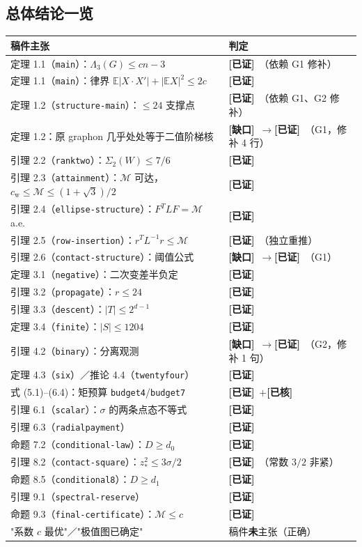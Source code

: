 \documentclass[UTF8,11pt]{ctexart}
\theoremstyle{definition}
\newcommand{\Lam}{\Lambda}
\newcommand{\E}{\mathbb{E}}
\newcommand{\ok}{\textcolor[rgb]{0.05,0.45,0.15}{\bfseries [已证]}}
\newcommand{\chk}{\textcolor[rgb]{0.05,0.25,0.55}{\bfseries [已核]}}
\newcommand{\gap}{\textcolor[rgb]{0.70,0.15,0.10}{\bfseries [缺口]}}
\begin{document}
\subsection{总体结论一览}
\begin{center}
\small
\begin{tabular}{@{}p{}p{}@{}}
\toprule
稿件主张 & 判定\\
\midrule
定理 1.1（\texttt{main}）：$\Lam_3(G)\le cn-3$ & \ok\ （依赖 G1 修补）\\
定理 1.1（\texttt{main}）：律界 $\E|X\!\cdot\!X'|+|\E X|^2\le 2c$ & \ok\\
定理 1.2（\texttt{structure-main}）：$\le24$ 支撑点 & \ok\ （依赖 G1、G2 修补）\\
定理 1.2：原 graphon 几乎处处等于二值阶梯核 & \gap\ $\to$\ok\ （G1，修补 4 行）\\
引理 2.2（\texttt{ranktwo}）：$\Sigma_2(W)\le7/6$ & \ok\\
引理 2.3（\texttt{attainment}）：$\mathcal M$ 可达，$c_{\mathrm w}\le\mathcal M\le(1+\sqrt3)/2$ & \ok\\
引理 2.4（\texttt{ellipse-structure}）：$F^TLF=\mathcal M$ a.e. & \ok\\
引理 2.5（\texttt{row-insertion}）：$r^TL^{-1}r\le\mathcal M$ & \ok\ （独立重推）\\
引理 2.6（\texttt{contact-structure}）：阈值公式 & \gap\ $\to$\ok\ （G1）\\
定理 3.1（\texttt{negative}）：二次变差半负定 & \ok\\
引理 3.2（\texttt{propagate}）：$r\le24$ & \ok\\
引理 3.3（\texttt{descent}）：$|T|\le2^{d-1}$ & \ok\\
定理 3.4（\texttt{finite}）：$|S|\le1204$ & \ok\\
引理 4.2（\texttt{binary}）：分离观测 & \gap\ $\to$\ok\ （G2，修补 1 句）\\
定理 4.3（\texttt{six}）／推论 4.4（\texttt{twentyfour}） & \ok\\
式 (5.1)--(6.4)：矩预算 \texttt{budget4}/\texttt{budget7} & \ok\ $+$\chk\\
引理 6.1（\texttt{scalar}）：$\sigma$ 的两条点态不等式 & \ok\\
引理 6.3（\texttt{radialpayment}） & \ok\\
命题 7.2（\texttt{conditional-law}）：$D\ge d_0$ & \ok\\
引理 8.2（\texttt{contact-square}）：$z_*^2\le3\sigma/2$ & \ok\ （常数 $3/2$ 非紧）\\
命题 8.5（\texttt{conditional8}）：$D\ge d_1$ & \ok\\
引理 9.1（\texttt{spectral-reserve}） & \ok\\
命题 9.3（\texttt{final-certificate}）：$\mathcal M\le c$ & \ok\\
"系数 $c$ 最优"／"极值图已确定" & 稿件\textbf{未}主张（正确）\\
\bottomrule
\end{tabular}
\end{center}
\end{document}
